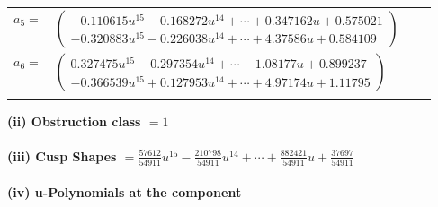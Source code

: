 \documentclass[1p]{elsarticle_modified}
\theoremstyle{definition}
\begin{document}
\begin{tabular}{m{7pt} m{180pt} m{7pt} m{180pt} }
\flushright $a_{5}=$&$\begin{pmatrix}-0.110615 u^{15}-0.168272 u^{14}+\cdots+0.347162 u+0.575021\\-0.320883 u^{15}-0.226038 u^{14}+\cdots+4.37586 u+0.584109\end{pmatrix}$ \\
\flushright $a_{6}=$&$\begin{pmatrix}0.327475 u^{15}-0.297354 u^{14}+\cdots-1.08177 u+0.899237\\-0.366539 u^{15}+0.127953 u^{14}+\cdots+4.97174 u+1.11795\end{pmatrix}$\\&\end{tabular}
\flushleft \textbf{(ii) Obstruction class $= 1$}\\~\\
\flushleft \textbf{(iii) Cusp Shapes $= \frac{57612}{54911} u^{15}-\frac{210798}{54911} u^{14}+\cdots+\frac{882421}{54911} u+\frac{37697}{54911}$}\\~\\
\newpage\renewcommand{\arraystretch}{1}
\flushleft \textbf{(iv) u-Polynomials at the component}\newline \\
\end{document}
